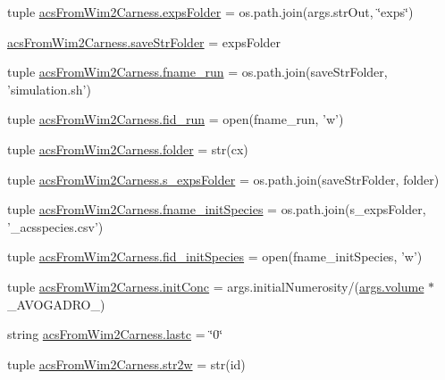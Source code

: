 \begin{DoxyCompactItemize}
tuple \hyperlink{a00128_aa78205fca6ef215871776684bc141b26}{acs\+From\+Wim2\+Carness.\+exps\+Folder} = os.\+path.\+join(args.\+str\+Out, \char`\"{}exps\char`\"{})
\item 
\hyperlink{a00128_adf74f9028f6a6e9a2de2046146a29ffe}{acs\+From\+Wim2\+Carness.\+save\+Str\+Folder} = exps\+Folder
\item 
tuple \hyperlink{a00128_a58053e5bf5bd9f634c82e6fe7a330770}{acs\+From\+Wim2\+Carness.\+fname\+\_\+run} = os.\+path.\+join(save\+Str\+Folder, 'simulation.\+sh')
\item 
tuple \hyperlink{a00128_a107606e6132ad38bc8591a7931a277fc}{acs\+From\+Wim2\+Carness.\+fid\+\_\+run} = open(fname\+\_\+run, 'w')
\item 
tuple \hyperlink{a00128_a42c0d5f9f5131fc14ddb04d765cee15b}{acs\+From\+Wim2\+Carness.\+folder} = str(cx)
\item 
tuple \hyperlink{a00128_ad8daa0d6fb501f0e422c7fb04e93c7cd}{acs\+From\+Wim2\+Carness.\+s\+\_\+exps\+Folder} = os.\+path.\+join(save\+Str\+Folder, folder)
\item 
tuple \hyperlink{a00128_a6053e1a97cef2ed661333b2a7b0cf67e}{acs\+From\+Wim2\+Carness.\+fname\+\_\+init\+Species} = os.\+path.\+join(s\+\_\+exps\+Folder, '\+\_\+acsspecies.\+csv')
\item 
tuple \hyperlink{a00128_aac88079820753d1e8c6628b7016a71d5}{acs\+From\+Wim2\+Carness.\+fid\+\_\+init\+Species} = open(fname\+\_\+init\+Species, 'w')
\item 
tuple \hyperlink{a00128_a4fad8527bf8c9b7981003678aba3edff}{acs\+From\+Wim2\+Carness.\+init\+Conc} = args.\+initial\+Numerosity/(\hyperlink{a00113_a9bc498ccac8db41438f855f5dd3f4c05}{args.\+volume} $\ast$ \+\_\+\+A\+V\+O\+G\+A\+D\+R\+O\+\_\+)
\item 
string \hyperlink{a00128_ae1f2c64eb13a9c020ffe6ec073883573}{acs\+From\+Wim2\+Carness.\+lastc} = \char`\"{}0\char`\"{}
\item 
tuple \hyperlink{a00128_a015e630bcbd779acd7f68bf514793e0d}{acs\+From\+Wim2\+Carness.\+str2w} = str(id)
\end{DoxyCompactItemize}
